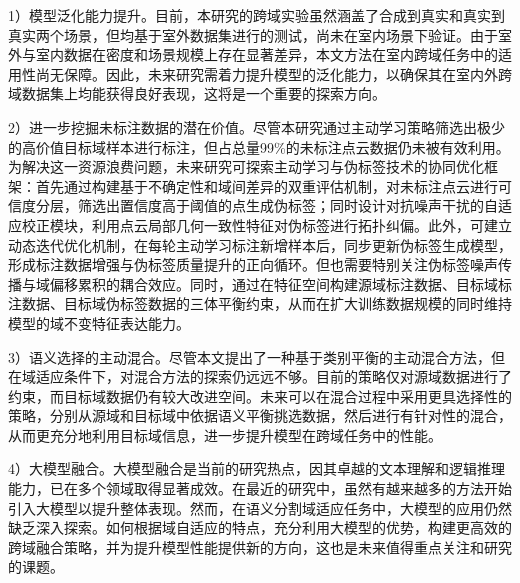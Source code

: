 1）模型泛化能力提升。目前，本研究的跨域实验虽然涵盖了合成到真实和真实到真实两个场景，但均基于室外数据集进行的测试，尚未在室内场景下验证。由于室外与室内数据在密度和场景规模上存在显著差异，本文方法在室内跨域任务中的适用性尚无保障。因此，未来研究需着力提升模型的泛化能力，以确保其在室内外跨域数据集上均能获得良好表现，这将是一个重要的探索方向。

2）进一步挖掘未标注数据的潜在价值。尽管本研究通过主动学习策略筛选出极少的高价值目标域样本进行标注，但占总量99\%的未标注点云数据仍未被有效利用。为解决这一资源浪费问题，未来研究可探索主动学习与伪标签技术的协同优化框架：首先通过构建基于不确定性和域间差异的双重评估机制，对未标注点云进行可信度分层，筛选出置信度高于阈值的点生成伪标签；同时设计对抗噪声干扰的自适应校正模块，利用点云局部几何一致性特征对伪标签进行拓扑纠偏。此外，可建立动态迭代优化机制，在每轮主动学习标注新增样本后，同步更新伪标签生成模型，形成标注数据增强与伪标签质量提升的正向循环。但也需要特别关注伪标签噪声传播与域偏移累积的耦合效应。同时，通过在特征空间构建源域标注数据、目标域标注数据、目标域伪标签数据的三体平衡约束，从而在扩大训练数据规模的同时维持模型的域不变特征表达能力。

3）语义选择的主动混合。尽管本文提出了一种基于类别平衡的主动混合方法，但在域适应条件下，对混合方法的探索仍远远不够。目前的策略仅对源域数据进行了约束，而目标域数据仍有较大改进空间。未来可以在混合过程中采用更具选择性的策略，分别从源域和目标域中依据语义平衡挑选数据，然后进行有针对性的混合，从而更充分地利用目标域信息，进一步提升模型在跨域任务中的性能。

4）大模型融合。大模型融合是当前的研究热点，因其卓越的文本理解和逻辑推理能力，已在多个领域取得显著成效。在最近的研究中，虽然有越来越多的方法开始引入大模型以提升整体表现。然而，在语义分割域适应任务中，大模型的应用仍然缺乏深入探索。如何根据域自适应的特点，充分利用大模型的优势，构建更高效的跨域融合策略，并为提升模型性能提供新的方向，这也是未来值得重点关注和研究的课题。
